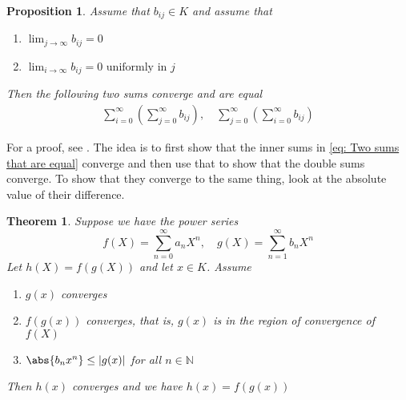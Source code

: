 \documentclass{article}
\newtheorem{theorem}{Theorem}[section]
\newtheorem{proposition}{Proposition}[section]
\newcommand{\mbb}[1]{\mathbb{#1}}
\numberwithin{equation}{section}
\begin{document}
\begin{proposition}\label{prop: Swap of summation}
    Assume that $b_{ij} \in K$ and assume that
    \begin{enumerate}
        \item $\lim_{j \to \infty}b_{ij} = 0$
        \item $\lim_{i \to \infty} b_{ij} = 0 \text{ uniformly in } j$
    \end{enumerate}
    Then the following two sums converge and are equal
    \begin{equation}\label{eq: Two sums that are equal}
        \begin{aligned}
            \sum_{i = 0}^\infty (\sum_{j = 0}^\infty b_{ij}), \quad \sum_{j = 0}^\infty (\sum_{i = 0}^\infty b_{ij})
        \end{aligned}
    \end{equation}
\end{proposition}
For a proof, see \citep[Proposition 5.1.4]{gouvea}. The idea is to first show that the inner sums in \cref{eq: Two sums that are equal} converge and then use that to show that the double sums converge. To show that they converge to the same thing, look at the absolute value of their difference.
\begin{theorem}\label{prop: The composite of formal power series converges}
    Suppose we have the power series
    $$f(X) = \sum_{n=0}^\infty a_n X^n, \quad g(X) = \sum_{n=1}^\infty b_n X^n$$
    Let $h(X) = f(g(X))$ and let $x \in K$. Assume
    \begin{enumerate}
        \item $g(x)$ converges
        \item $f(g(x))$ converges, that is, $g(x)$ is in the region of convergence of $f(X)$
        \item $\abs{b_n x^n} \leq |g(x)|$ for all $n \in \mbb N$
    \end{enumerate}
    Then $h(x)$ converges and we have $h(x) = f(g(x))$
\end{theorem}
\end{document}
